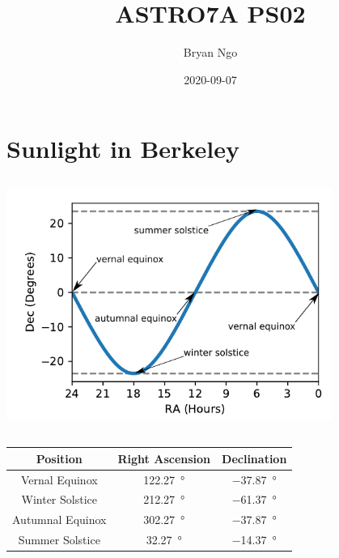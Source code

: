 \documentclass{article}
\title{ASTRO7A PS02}
\author{Bryan Ngo}
\date{2020-09-07}
\begin{document}
\maketitle

\section{Sunlight in Berkeley}

\subsection{}

\begin{center}
    \includegraphics[width=0.8\textwidth]{q1.png}
\end{center}

\subsection{}

\begin{center}
    \begin{tabular}{||c|c|c||}
        \hline
        Position & Right Ascension & Declination \\
        \hline
        Vernal Equinox & \SI{122.27}{\degree} & \SI{-37.87}{\degree} \\
        Winter Solstice & \SI{212.27}{\degree} & \SI{-61.37}{\degree} \\
        Autumnal Equinox & \SI{302.27}{\degree} & \SI{-37.87}{\degree} \\
        Summer Solstice & \SI{32.27}{\degree} & \SI{-14.37}{\degree} \\
        \hline
    \end{tabular}
\end{center}
\end{document}
